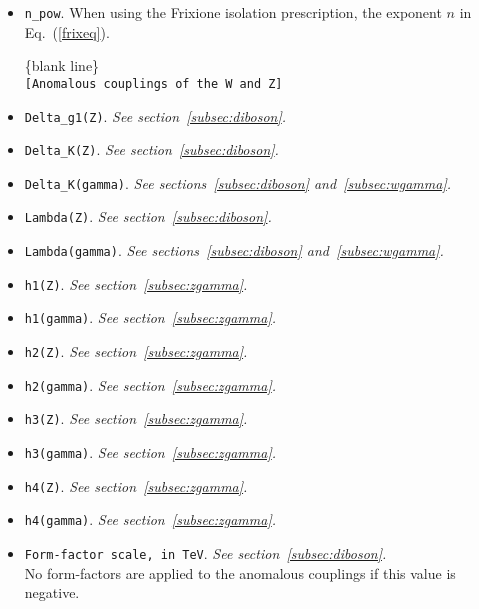 \documentclass[12pt]{article}
\begin{document}
\begin{itemize}
\item {\tt n\_pow}. When using the Frixione isolation prescription, the exponent $n$ in Eq.~(\ref{frixeq}).


\begin{center}
\{blank line\} \\
{\tt [Anomalous couplings of the W and Z] }
\end{center}

\item {\tt Delta\_g1(Z)}. {\it See section~\ref{subsec:diboson}.}
\item {\tt Delta\_K(Z)}. {\it See section~\ref{subsec:diboson}.}
\item {\tt Delta\_K(gamma)}. {\it See sections~\ref{subsec:diboson} and~\ref{subsec:wgamma}.}
\item {\tt Lambda(Z)}. {\it See section~\ref{subsec:diboson}.}
\item {\tt Lambda(gamma)}. {\it See sections~\ref{subsec:diboson} and~\ref{subsec:wgamma}.}
\item {\tt h1(Z)}. {\it See section~\ref{subsec:zgamma}.}
\item {\tt h1(gamma)}. {\it See section~\ref{subsec:zgamma}.}
\item {\tt h2(Z)}. {\it See section~\ref{subsec:zgamma}.}
\item {\tt h2(gamma)}. {\it See section~\ref{subsec:zgamma}.}
\item {\tt h3(Z)}. {\it See section~\ref{subsec:zgamma}.}
\item {\tt h3(gamma)}. {\it See section~\ref{subsec:zgamma}.}
\item {\tt h4(Z)}. {\it See section~\ref{subsec:zgamma}.}
\item {\tt h4(gamma)}. {\it See section~\ref{subsec:zgamma}.}
\item {\tt Form-factor scale, in TeV}. {\it See section~\ref{subsec:diboson}.} \\
No form-factors are applied to the anomalous couplings if this value is negative.


\end{itemize}
\end{document}
